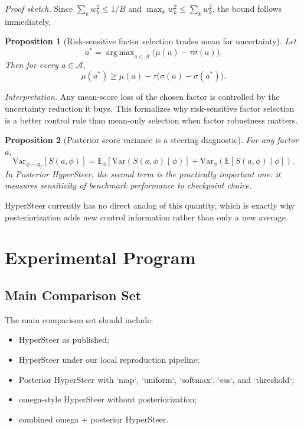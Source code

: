 \documentclass[10pt]{article}
\newtheorem{proposition}{Proposition}
\newcommand{\E}{\mathbb{E}}
\newcommand{\Var}{\mathrm{Var}}
\newcommand{\argmax}{\mathop{\mathrm{arg\,max}}}
\begin{document}
\noindent\textit{Proof sketch.} Since $\sum_k w_k^2 \le 1/B$ and $\max_k w_k^2 \le \sum_k w_k^2$, the bound follows immediately.

\begin{proposition}[Risk-sensitive factor selection trades mean for uncertainty]
Let
\begin{equation}
a^* = \argmax_{a \in \mathcal{A}} \bigl(\mu(a) - \tau \sigma(a)\bigr).
\end{equation}
Then for every $a \in \mathcal{A}$,
\begin{equation}
\mu(a^*) \ge \mu(a) - \tau\bigl(\sigma(a)-\sigma(a^*)\bigr).
\end{equation}
\end{proposition}

\noindent\textit{Interpretation.} Any mean-score loss of the chosen factor is controlled by the uncertainty reduction it buys. This formalizes why risk-sensitive factor selection is a better control rule than mean-only selection when factor robustness matters.

\begin{proposition}[Posterior score variance is a steering diagnostic]
For any factor $a$,
\begin{equation}
\Var_{\phi \sim q_T}[S(a,\phi)]
=
\E_{\phi}\!\left[\Var(S(a,\phi)\mid\phi)\right]
+
\Var_{\phi}\!\left(\E[S(a,\phi)\mid\phi]\right).
\end{equation}
In Posterior HyperSteer, the second term is the practically important one: it measures sensitivity of benchmark performance to checkpoint choice.
\end{proposition}

HyperSteer currently has no direct analog of this quantity, which is exactly why posteriorization adds new control information rather than only a new average.

\section{Experimental Program}

\subsection{Main Comparison Set}

The main comparison set should include:
\begin{itemize}[leftmargin=1.5em]
  \item HyperSteer as published;
  \item HyperSteer under our local reproduction pipeline;
  \item Posterior HyperSteer with `map`, `uniform`, `softmax`, `ess`, and `threshold`;
  \item omega-style HyperSteer without posteriorization;
  \item combined omega + posterior HyperSteer.
\end{itemize}
\end{document}
